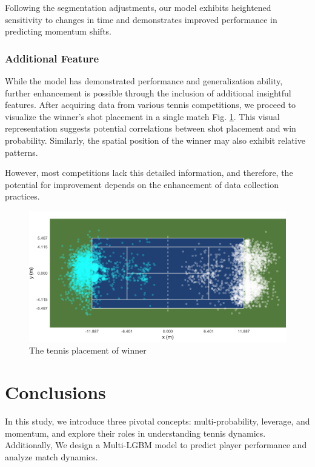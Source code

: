 \documentclass{mcmthesis}
\begin{document}
Following the segmentation adjustments, our model exhibits heightened sensitivity to changes in time and demonstrates improved performance in predicting momentum shifts.

\subsubsection{Additional Feature}
While the model has demonstrated performance and generalization ability, further enhancement is possible through the inclusion of additional insightful features. After acquiring data from various tennis competitions, we proceed to visualize the winner's shot placement in a single match Fig. \ref{figure:tennis shot}. This visual representation suggests potential correlations between shot placement and win probability. Similarly, the spatial position of the winner may also exhibit relative patterns.

However, most competitions lack this detailed information, and therefore, the potential for improvement depends on the enhancement of data collection practices.

\begin{figure}[ht]
    \centering
    \begin{minipage}{0.6\textwidth}
        \centering
        \includegraphics[width=\textwidth]{figures/tennis.png} 
        \caption{The tennis placement of winner}
        \label{figure:tennis shot}
    \end{minipage}\hfill
\end{figure}

\section{Conclusions}
In this study, we introduce three pivotal concepts: multi-probability, leverage, and momentum, and explore their roles in understanding tennis dynamics. Additionally, We design a Multi-LGBM model to predict player performance and analyze match dynamics.
\end{document}
